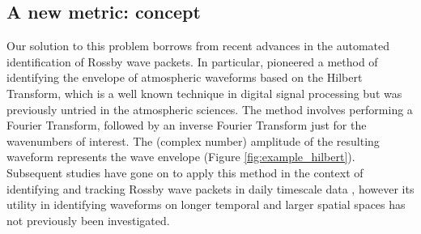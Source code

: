 \subsection{A new metric: concept}

Our solution to this problem borrows from recent advances in the automated identification of Rossby wave packets. In particular, \citet{Zimin2003} pioneered a method of identifying the envelope of atmospheric waveforms based on the Hilbert Transform, which is a well known technique in digital signal processing but was previously untried in the atmospheric sciences. The method involves performing a Fourier Transform, followed by an inverse Fourier Transform just for the wavenumbers of interest. The (complex number) amplitude of the resulting waveform represents the wave envelope (Figure \ref{fig:example_hilbert}). Subsequent studies have gone on to apply this method in the context of identifying and tracking Rossby wave packets in daily timescale data \citep{Glatt2014,Souders2014a}, however its utility in identifying waveforms on longer temporal and larger spatial spaces has not previously been investigated.